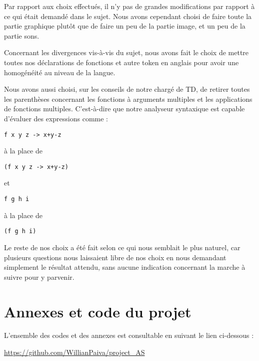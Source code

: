 \documentclass{article}
\begin{document}
	Par rapport aux choix effectués, il n'y pas de grandes modifications par rapport à ce qui était demandé dans le sujet. Nous avons cependant choisi de faire toute la partie graphique plutôt que de faire un peu de la partie image, et un peu de la partie sons. 
	
Concernant les divergences vis-à-vis du sujet, nous avons fait le choix de mettre toutes nos déclarations de fonctions et autre token en anglais pour avoir une homogénéité au niveau de la langue. 

Nous avons aussi choisi, sur les conseils de notre chargé de TD, de retirer toutes les parenthèses concernant les fonctions à arguments multiples et les applications de fonctions multiples. C'est-à-dire que notre analyseur syntaxique est capable d'évaluer des expressions comme :

\begin{verbatim}	
f x y z -> x+y-z   
\end{verbatim}
à la place de 
\begin{verbatim}
(f x y z -> x+y-z)
\end{verbatim}
et     
\begin{verbatim}
f g h i    
\end{verbatim}
à la place de
\begin{verbatim}
(f g h i)
\end{verbatim}

	
Le reste de nos choix a été fait selon ce qui nous semblait le plus naturel, car plusieurs questions nous laissaient libre de nos choix en nous demandant simplement le résultat attendu, sans aucune indication concernant la marche à suivre pour y parvenir.



\section{Annexes et code du projet}

L'ensemble des codes et des annexes est consultable en suivant le lien ci-dessous : 

\url{https://github.com/WillianPaiva/project_AS}
\end{document}
